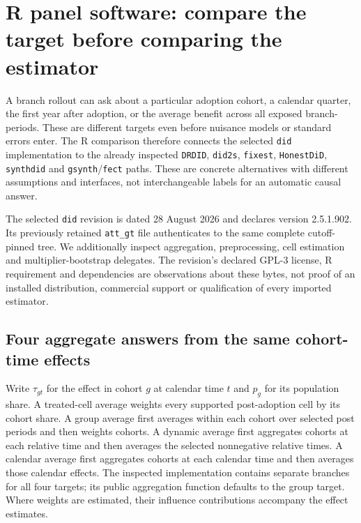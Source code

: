 \section{R panel software: compare the target before comparing the estimator}
\label{sec:exec24-panels-r}

A branch rollout can ask about a particular adoption cohort, a calendar
quarter, the first year after adoption, or the average benefit across all
exposed branch-periods. These are different targets even before nuisance
models or standard errors enter. The R comparison therefore connects the
selected \texttt{did} implementation to the already inspected
\texttt{DRDID}, \texttt{did2s}, \texttt{fixest}, \texttt{HonestDiD},
\texttt{synthdid} and \texttt{gsynth}/\texttt{fect} paths. These are concrete
alternatives with different assumptions and interfaces, not interchangeable
labels for an automatic causal answer.
\citep{exec24_panelr_contract}

The selected \texttt{did} revision is dated 28 August 2026 and declares
version 2.5.1.902. Its previously retained \texttt{att\_gt} file authenticates
to the same complete cutoff-pinned tree. We additionally inspect aggregation,
preprocessing, cell estimation and multiplier-bootstrap delegates. The
revision's declared GPL-3 license, R requirement and dependencies are
observations about these bytes, not proof of an installed distribution,
commercial support or qualification of every imported estimator.
\citep{exec24_panelr_did}

\subsection{Four aggregate answers from the same cohort-time effects}
Write $\tau_{gt}$ for the effect in cohort $g$ at calendar time $t$ and $p_g$
for its population share. A treated-cell average weights every supported
post-adoption cell by its cohort share. A group average first averages within
each cohort over selected post periods and then weights cohorts. A dynamic
average first aggregates cohorts at each relative time and then averages the
selected nonnegative relative times. A calendar average first aggregates
cohorts at each calendar time and then averages those calendar effects.
The inspected implementation contains separate branches for all four targets;
its public aggregation function defaults to the group target. Where weights
are estimated, their influence contributions accompany the effect estimates.
\citep{exec24_panelr_did}


